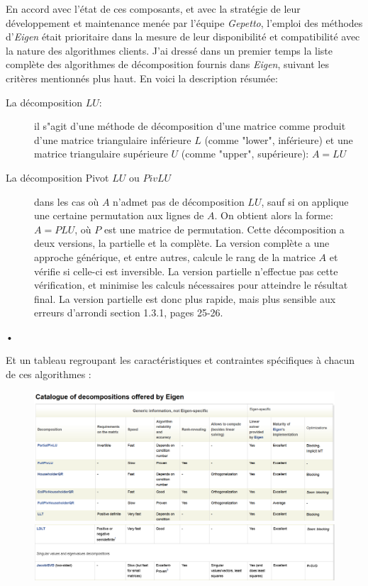 \documentclass{report}
\begin{document}
En accord avec l'état de ces composants, et avec la stratégie de leur développement et maintenance menée par l'équipe \emph{Gepetto}, l'emploi des méthodes d'\emph{Eigen} était prioritaire dans la mesure de leur disponibilité et compatibilité avec la nature des algorithmes clients. J'ai dressé dans un premier temps la liste complète des algorithmes de décomposition fournis dans \emph{Eigen}, suivant les critères mentionnés plus haut. En voici la description résumée:

\begin{description}
\item[La décomposition $LU$:] il s"agit d'une méthode de décomposition d'une matrice comme produit d'une matrice triangulaire inférieure $L$ (comme "lower", inférieure) et une matrice triangulaire supérieure $U$ (comme "upper", supérieure): $A=LU$ \cite{bib_decompositionLUwikipedia} \cite{bib_decompositionLU_2}
\item[La décomposition Pivot $LU$ ou $PivLU$] dans les cas où $A$ n'admet pas de décomposition $LU$, sauf si on applique une certaine permutation aux lignes de $A$. On obtient alors la forme: $A=PLU$, où $P$ est une matrice de permutation. Cette décomposition a deux versions, la partielle et la complète. La version complète a une approche générique, et entre autres, calcule le rang de la matrice $A$ et vérifie si celle-ci est inversible. La version partielle n'effectue pas cette vérification, et minimise les calculs nécessaires pour atteindre le résultat final. La version partielle est donc plus rapide, mais plus sensible aux erreurs d'arrondi \cite{bib_decompositionLU_1} section 1.3.1, pages 25-26.
\item[•]
\end{description}

Et un tableau regroupant les caractéristiques et contraintes spécifiques à chacun de ces algorithmes \cite{bib_eigen_tutorial_catalogue}:

\begin{figure}[H]
\centering
\includegraphics[width=\textwidth]{figs/decompositionCatalogueEigen1.png}
\includegraphics[width=\textwidth]{figs/decompositionCatalogueEigen2.png}
\end{figure}
\end{document}
